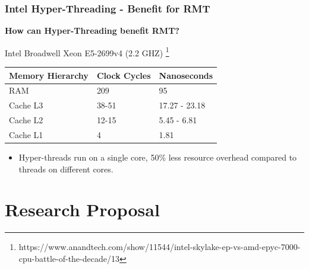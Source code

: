 \documentclass[xcolor=pdftex,dvipsnames,table]{beamer}
\begin{document}
\begin{frame}
	\frametitle{Intel Hyper-Threading - Benefit for RMT}
    
    \begin{shaded}
    	\centerline{\textbf{How can Hyper-Threading benefit RMT?}}
    \end{shaded}
    
   \centerline{Intel Broadwell Xeon E5-2699v4 (2.2 GHZ) \footnote{https://www.anandtech.com/show/11544/intel-skylake-ep-vs-amd-epyc-7000-cpu-battle-of-the-decade/13}}
   
\begin{center}
    \begin{tabular}{| l | l | l |} \hline
    	\textbf{Memory Hierarchy} & \textbf{Clock Cycles }& \textbf{Nanoseconds} \\ \hline
    	RAM & 209 & 95 \\ \hline
    	Cache L3 & 38-51 & 17.27 - 23.18 \\ \hline
    	Cache L2 & 12-15 & 5.45 - 6.81 \\ \hline
    	Cache L1 & 4 & 1.81 \\ \hline    
    \end{tabular}
\end{center}   \pause
    
    \begin{itemize}     	    	
        \item Hyper-threads run on a single core, 50\% less resource overhead compared to threads on different cores.
    \end{itemize}
\end{frame}

\section{Research Proposal}
\end{document}
